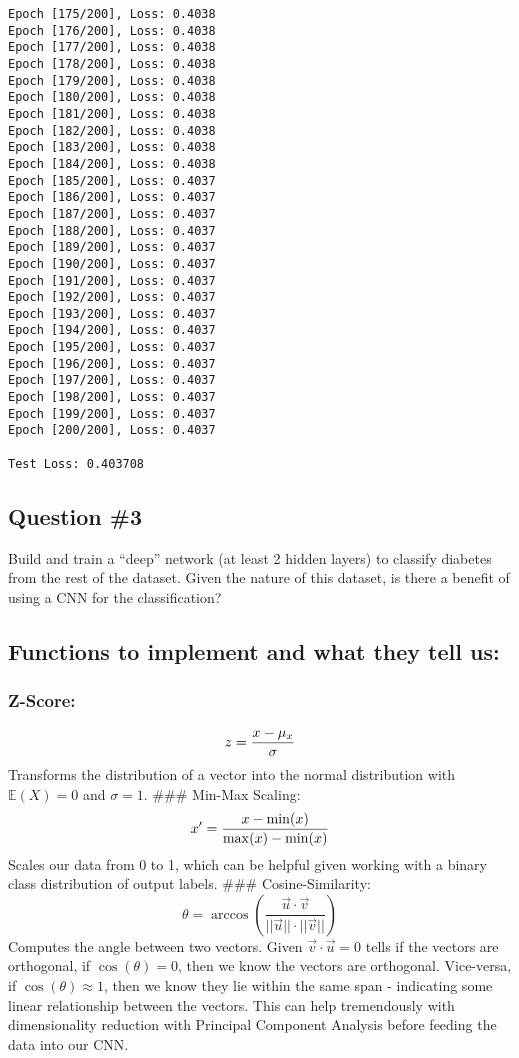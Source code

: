 \documentclass[11pt]{article}
\begin{document}
\begin{Verbatim}[commandchars=\\\{\}]
Epoch [175/200], Loss: 0.4038
Epoch [176/200], Loss: 0.4038
Epoch [177/200], Loss: 0.4038
Epoch [178/200], Loss: 0.4038
Epoch [179/200], Loss: 0.4038
Epoch [180/200], Loss: 0.4038
Epoch [181/200], Loss: 0.4038
Epoch [182/200], Loss: 0.4038
Epoch [183/200], Loss: 0.4038
Epoch [184/200], Loss: 0.4038
Epoch [185/200], Loss: 0.4037
Epoch [186/200], Loss: 0.4037
Epoch [187/200], Loss: 0.4037
Epoch [188/200], Loss: 0.4037
Epoch [189/200], Loss: 0.4037
Epoch [190/200], Loss: 0.4037
Epoch [191/200], Loss: 0.4037
Epoch [192/200], Loss: 0.4037
Epoch [193/200], Loss: 0.4037
Epoch [194/200], Loss: 0.4037
Epoch [195/200], Loss: 0.4037
Epoch [196/200], Loss: 0.4037
Epoch [197/200], Loss: 0.4037
Epoch [198/200], Loss: 0.4037
Epoch [199/200], Loss: 0.4037
Epoch [200/200], Loss: 0.4037

Test Loss: 0.403708
    \end{Verbatim}

    \subsection{Question \#3}\label{question-3}

Build and train a ``deep'' network (at least 2 hidden layers) to
classify diabetes from the rest of the dataset. Given the nature of this
dataset, is there a benefit of using a CNN for the classification?

    \subsection{Functions to implement and what they tell
us:}\label{functions-to-implement-and-what-they-tell-us}

\subsubsection{Z-Score:}\label{z-score}

\[
z = \frac{x - \mu_{x}}{\sigma} \\
\] Transforms the distribution of a vector into the normal distribution
with \(\mathbb{E}(X) = 0\) and \(\sigma = 1\). \#\#\# Min-Max Scaling:
\[
x' = \frac{x - \min(x)}{\max(x) - \min(x)}\\
\] Scales our data from 0 to 1, which can be helpful given working with
a binary class distribution of output labels. \#\#\# Cosine-Similarity:
\[
\theta = \arccos(\frac{\vec{u} \cdot \vec{v}}{||\vec{u}|| \cdot ||\vec{v}||})
\] Computes the angle between two vectors. Given
\(\vec{v} \cdot \vec{u} = 0\) tells if the vectors are orthogonal, if
\(\cos(\theta) = 0\), then we know the vectors are orthogonal.
Vice-versa, if \(\cos(\theta) \approx 1\), then we know they lie within
the same span - indicating some linear relationship between the vectors.
This can help tremendously with dimensionality reduction with Principal
Component Analysis before feeding the data into our CNN.
\end{document}
